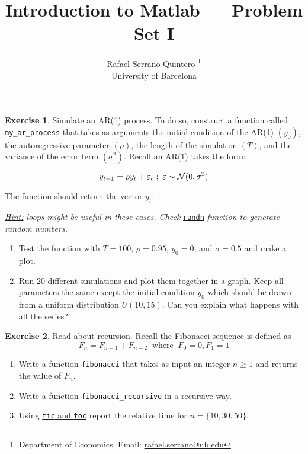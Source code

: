\documentclass[a4paper,11pt]{article}
\title{\textbf{Introduction to Matlab --- Problem Set I}}
\author{Rafael Serrano Quintero
\thanks{Department of Economics. Email: \href{mailto:rafael.serrano@ub.edu}{rafael.serrano@ub.edu}} \\
University of Barcelona \\}
\date{}
\theoremstyle{definition}
\newtheorem{exercise}{Exercise}
\begin{document}
\VerbatimFootnotes

\maketitle

\begin{exercise}
Simulate an AR(1) process. To do so, construct a function called \verb;my_ar_process; that takes as arguments the initial condition of the AR(1) $(y_0)$, the autoregressive parameter $(\rho)$, the length of the simulation $(T)$, and the variance of the error term $(\sigma^2)$. Recall an AR(1) takes the form:
    
\[
y_{t+1} = \rho y_t + \varepsilon_{t} \ ; \ \varepsilon\thicksim \mathcal{N}(0, \sigma^2)
\]

The function should return the vector $y_t$.

\textit{\underline{Hint:} loops might be useful in these cases. Check} \href{https://www.mathworks.com/help/matlab/ref/randn.html}{\texttt{randn}} \textit{function to generate random numbers.}

\begin{enumerate}
    \item Test the function with $T = 100$, $\rho = 0.95$, $y_0 = 0$, and $\sigma = 0.5$ and make a plot.
    \item Run $20$ different simulations and plot them together in a graph. Keep all parameters the same except the initial condition $y_0$ which should be drawn from a uniform distribution $U(10,15)$. Can you explain what happens with all the series?
\end{enumerate}
\end{exercise}

\begin{exercise}
Read about \href{https://en.wikipedia.org/wiki/Recursion_(computer_science)}{recursion}. Recall the Fibonacci sequence is defined as
\[
F_n = F_{n-1} + F_{n-2}  \ \text{ where } \ F_0 = 0, F_1 = 1
\]
\begin{enumerate}
    \item Write a function \verb;fibonacci; that takes as input an integer $n\geq 1$ and returns the value of $F_n$.
    \item Write a function \verb;fibonacci_recursive; in a recursive way.
    \item Using \href{https://www.mathworks.com/help/matlab/ref/tic.html}{\texttt{tic} and \texttt{toc}} report the relative time for $n = \{10,30,50\}$.
\end{enumerate}
\end{exercise}
\end{document}
